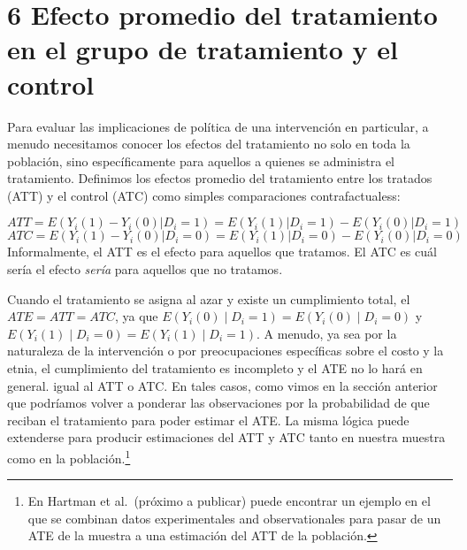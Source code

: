 \documentclass[
]{article}
\begin{document}
\hypertarget{efecto-promedio-del-tratamiento-en-el-grupo-de-tratamiento-y-el-control}{%
\section{6 Efecto promedio del tratamiento en el grupo de tratamiento y
el
control}\label{efecto-promedio-del-tratamiento-en-el-grupo-de-tratamiento-y-el-control}}

Para evaluar las implicaciones de política de una intervención en
particular, a menudo necesitamos conocer los efectos del tratamiento no
solo en toda la población, sino específicamente para aquellos a quienes
se administra el tratamiento. Definimos los efectos promedio del
tratamiento entre los tratados (ATT) y el control (ATC) como simples
comparaciones contrafactualess:

\[ATT=E(Y_i(1)-Y_i(0)|D_i=1)=E(Y_i(1)|D_i=1)-E(Y_i(0)|D_i=1)\]
\[ATC=E(Y_i(1)-Y_i(0)|D_i=0)=E(Y_i(1)|D_i=0)-E(Y_i(0)|D_i=0)\]
Informalmente, el ATT es el efecto para aquellos que tratamos. El ATC es
cuál sería el efecto \emph{sería} para aquellos que no tratamos.

Cuando el tratamiento se asigna al azar y existe un cumplimiento total,
el \(ATE= ATT =ATC\), ya que
\(E(Y_i (0) ∣D_i = 1) = E (Y_i (0) ∣D_i = 0)\) y
\(E ( Y_i (1) ∣D_i = 0) = E (Y_i (1) ∣D_i = 1)\). A menudo, ya sea por
la naturaleza de la intervención o por preocupaciones específicas sobre
el costo y la etnia, el cumplimiento del tratamiento es incompleto y el
ATE no lo hará en general. igual al ATT o ATC. En tales casos, como
vimos en la sección anterior que podríamos volver a ponderar las
observaciones por la probabilidad de que reciban el tratamiento para
poder estimar el ATE. La misma lógica puede extenderse para producir
estimaciones del ATT y ATC tanto en nuestra muestra como en la
población.\footnote{En Hartman et al.~(próximo a publicar) puede
  encontrar un ejemplo en el que se combinan datos experimentales and
  observationales para pasar de un ATE de la muestra a una estimación
  del ATT de la población.}
\end{document}
